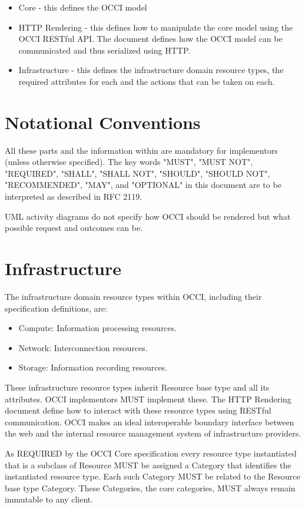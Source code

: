 \documentclass[10pt,a4paper]{article}
\begin{document}
\begin{itemize}
\item Core - this defines the OCCI model
\item HTTP Rendering - this defines how to manipulate the core model using the OCCI RESTful API. The document defines how the OCCI model can be communicated and thus serialized using HTTP.
\item Infrastructure - this defines the infrastructure domain resource types, the required attributes for each and the actions that can be taken on each.
\end{itemize}

\section{Notational Conventions}

All these parts and the information within are mandatory for implementors (unless otherwise specified). The key words "MUST", "MUST NOT", "REQUIRED", "SHALL", "SHALL NOT", "SHOULD", "SHOULD NOT", "RECOMMENDED", "MAY", and "OPTIONAL" in this document are to be interpreted as described in RFC 2119. 

UML activity diagrams do not specify how OCCI should be rendered but what possible request and outcomes can be.


\section{Infrastructure}

The infrastructure domain resource types within OCCI, including their specification definitions, are:
\begin{itemize}
\item Compute: Information processing resources.
\item Network: Interconnection resources.
\item Storage: Information recording resources.
\end{itemize}
These infrastructure resource types inherit Resource base type and all its attributes. OCCI implementors MUST implement these. The HTTP Rendering document define how to interact with these resource types using RESTful communication. OCCI makes an ideal interoperable boundary interface between the web and the internal resource management system of infrastructure providers.

As REQUIRED by the OCCI Core specification every resource type instantiated that is a subclass of Resource MUST be assigned a Category that identifies the instantiated resource type. Each such Category MUST be related to the Resource base type Category. These Categories, the core categories, MUST always remain immutable to any client.
\end{document}
